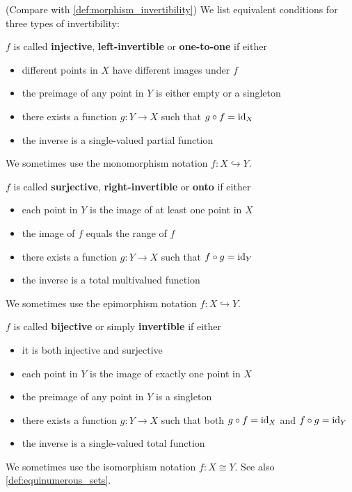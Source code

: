 \begin{definition}\label{def:function_invertibility}(Compare with \cref{def:morphism_invertibility})
  We list equivalent conditions for three types of invertibility:
  \begin{defenum}
     \( f \) is called \textbf{injective}, \textbf{left-invertible} or \textbf{one-to-one} if either
    \begin{itemize}
      \item different points in \( X \) have different images under \( f \)
      \item the preimage of any point in \( Y \) is either empty or a singleton
      \item there exists a function \( g: Y \to X \) such that \( g \circ f = \operatorname{id}_X \)
      \item the inverse is a single-valued partial function
    \end{itemize}

    We sometimes use the monomorphism notation \( f: X \hookrightarrow Y \).

     \( f \) is called \textbf{surjective}, \textbf{right-invertible} or \textbf{onto} if either
    \begin{itemize}
      \item each point in \( Y \) is the image of at least one point in \( X \)
      \item the image of \( f \) equals the range of \( f \)
      \item there exists a function \( g: Y \to X \) such that \( f \circ g = \operatorname{id}_Y \)
      \item the inverse is a total multivalued function
    \end{itemize}

    We sometimes use the epimorphism notation \( f: X \hookrightarrow Y \).

     \( f \) is called \textbf{bijective} or simply \textbf{invertible} if either
    \begin{itemize}
      \item it is both injective and surjective
      \item each point in \( Y \) is the image of exactly one point in \( X \)
      \item the preimage of any point in \( Y \) is a singleton
      \item there exists a function \( g: Y \to X \) such that both \( g \circ f = \operatorname{id}_X \) and \( f \circ g = \operatorname{id}_Y \)
      \item the inverse is a single-valued total function
    \end{itemize}

    We sometimes use the isomorphism notation \( f: X \cong Y \). See also \cref{def:equinumerous_sets}.
  \end{defenum}
\end{definition}

